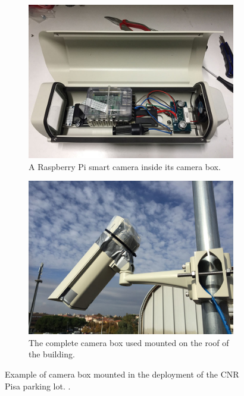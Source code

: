 \begin{figure}
	\centering
    \begin{subfigure}{0.48\columnwidth}
		\includegraphics[width=\columnwidth]{camera_inside}
        \caption{A Raspberry Pi smart camera inside its camera box.}
	\end{subfigure} %
    \begin{subfigure}{0.48\columnwidth}
		\includegraphics[width=\columnwidth]{camera_box}
        \caption{The complete camera box used mounted on the roof of the building.}
	\end{subfigure}
	\caption{Example of camera box mounted in the deployment of the CNR Pisa parking lot. .}
	\label{fig:mini:camera-box}
\end{figure}

